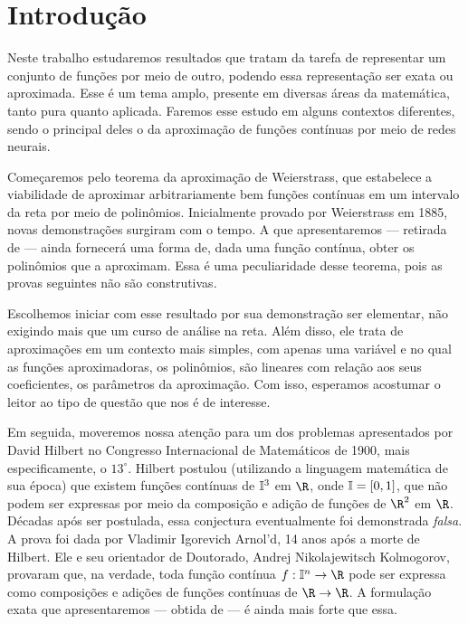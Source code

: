\section{Introdução}

Neste trabalho estudaremos resultados que tratam da tarefa de representar um conjunto de funções por meio de outro, podendo essa representação ser exata ou aproximada.
Esse é um tema amplo, presente em diversas áreas da matemática, tanto pura quanto aplicada.
Faremos esse estudo em alguns contextos diferentes, sendo o principal deles o da aproximação de funções contínuas por meio de redes neurais.

Começaremos pelo teorema da aproximação de Weierstrass, que estabelece a viabilidade de aproximar arbitrariamente bem funções contínuas em um intervalo da reta por meio de polinômios.
Inicialmente provado por Weierstrass em 1885, novas demonstrações surgiram com o tempo.
A que apresentaremos --- retirada de \cite{weierstrass} --- ainda fornecerá uma forma de, dada uma função contínua, obter os polinômios que a aproximam.
Essa é uma peculiaridade desse teorema, pois as provas seguintes não são construtivas.

Escolhemos iniciar com esse resultado por sua demonstração ser elementar, não exigindo mais que um curso de análise na reta.
Além disso, ele trata de aproximações em um contexto mais simples, com apenas uma variável e no qual as funções aproximadoras, os polinômios, são lineares com relação aos seus coeficientes, os parâmetros da aproximação.
Com isso, esperamos acostumar o leitor ao tipo de questão que nos é de interesse.

Em seguida, moveremos nossa atenção para um dos problemas apresentados por David Hilbert no Congresso Internacional de Matemáticos de 1900, mais especificamente, o \( 13^{ \circ } \).
Hilbert postulou (utilizando a linguagem matemática de sua época) que existem funções contínuas de \( \mathbb{I}^{ 3 } \) em \( \R \), onde \( \mathbb{I} = [0, 1] \), que não podem ser expressas por meio da composição e adição de funções de \( \R^{ 2 } \) em \( \R \).
Décadas após ser postulada, essa conjectura eventualmente foi demonstrada \emph{falsa}.
A prova foi dada por Vladimir Igorevich Arnol'd, 14 anos após a morte de Hilbert.
Ele e seu orientador de Doutorado, Andrej Nikolajewitsch Kolmogorov, provaram que, na verdade, toda função contínua \( f : \I^{ n } \to \R \) pode ser expressa como composições e adições de funções contínuas de \( \R \to \R \).
A formulação exata que apresentaremos --- obtida de \cite{hilbert} --- é ainda mais forte que essa.

